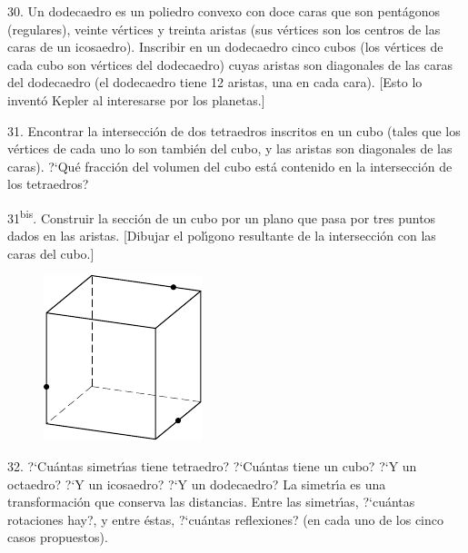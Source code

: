 \begin{problem}{30.}
	Un dodecaedro es un poliedro convexo con doce caras que son pent\'agonos (regulares), veinte v\'ertices y treinta aristas
	(sus v\'ertices son los centros de las caras de un icosaedro).
	Inscribir en un dodecaedro cinco cubos (los v\'ertices de cada cubo son v\'ertices del dodecaedro)
	cuyas aristas son diagonales de las caras del dodecaedro (el dodecaedro tiene 12 aristas, una en cada cara).
	[Esto lo invent\'o Kepler al interesarse por los planetas.] 
\end{problem}

\begin{problem}{31.}
	Encontrar la intersecci\'on de dos tetraedros inscritos en un cubo (tales que los v\'ertices de cada uno lo son tambi\'en del cubo, y las aristas son diagonales de las caras). 
	?`Qu\'e fracci\'on del volumen del cubo est\'a contenido en la intersecci\'on de los tetraedros?
\end{problem}

\begin{problem}{31\textsuperscript{bis}.}
	Construir la secci\'on de un cubo por un plano que pasa por tres puntos dados en las aristas.
	[Dibujar el pol\'{\i}gono resultante de la intersecci\'on con las caras del cubo.]
	\begin{figure}
		\includegraphics{resources/taskbook-15}
	\end{figure}
\end{problem}

\begin{problem}{32.}
	?`Cu\'antas simetr\'{\i}as tiene tetraedro? ?`Cu\'antas tiene un cubo? ?`Y un octaedro? ?`Y un icosaedro? ?`Y un dodecaedro?
	La simetr\'{\i}a es una transformaci\'on que conserva las distancias.
	Entre las simetr\'{\i}as, ?`cu\'antas rotaciones hay?, y entre \'estas, ?`cu\'antas reflexiones? (en cada uno de los cinco
	casos propuestos).
\end{problem}

